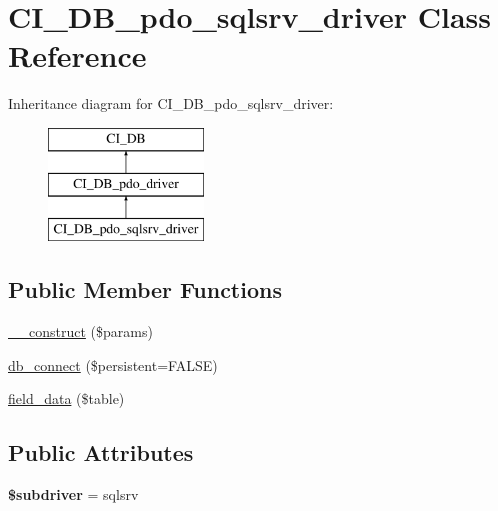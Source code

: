 \hypertarget{class_c_i___d_b__pdo__sqlsrv__driver}{}\section{C\+I\+\_\+\+D\+B\+\_\+pdo\+\_\+sqlsrv\+\_\+driver Class Reference}
\label{class_c_i___d_b__pdo__sqlsrv__driver}
Inheritance diagram for C\+I\+\_\+\+D\+B\+\_\+pdo\+\_\+sqlsrv\+\_\+driver\+:\begin{figure}[H]
\begin{center}
\leavevmode
\includegraphics[height=3.000000cm]{class_c_i___d_b__pdo__sqlsrv__driver}
\end{center}
\end{figure}
\subsection*{Public Member Functions}
\begin{DoxyCompactItemize}
\item 
\mbox{\hyperlink{class_c_i___d_b__pdo__sqlsrv__driver_aee97df012bfb3a41c47d3951a515ef5d}{\+\_\+\+\_\+construct}} (\$params)
\item 
\mbox{\hyperlink{class_c_i___d_b__pdo__sqlsrv__driver_a2073e6b802c3ace86aa33603ea76facf}{db\+\_\+connect}} (\$persistent=F\+A\+L\+SE)
\item 
\mbox{\hyperlink{class_c_i___d_b__pdo__sqlsrv__driver_add6a47c257555ecf61c5c0f3f6003874}{field\+\_\+data}} (\$table)
\end{DoxyCompactItemize}
\subsection*{Public Attributes}
\begin{DoxyCompactItemize}
\item 
\mbox{\label{class_c_i___d_b__pdo__sqlsrv__driver_a50355c6a688bbde1015aa53499e0200f}} 
{\bfseries \$subdriver} = \textquotesingle{}sqlsrv\textquotesingle{}
\end{DoxyCompactItemize}
